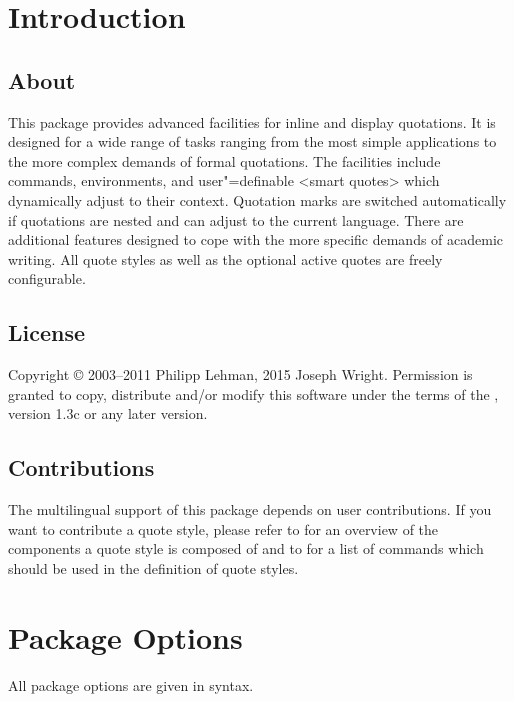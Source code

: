 \documentclass{ltxdockit}[2010/09/26]
\begin{document}
\printtitlepage
\tableofcontents
\listoftables

\section{Introduction}
\label{int}

\subsection[About]{About }

This package provides advanced facilities for inline and display quotations. It is designed for a wide range of tasks ranging from the most simple applications to the more complex demands of formal quotations. The facilities include commands, environments, and user"=definable <smart quotes> which dynamically adjust to their context. Quotation marks are switched automatically if quotations are nested and can adjust to the current language. There are additional features designed to cope with the more specific demands of academic writing. All quote styles as well as the optional active quotes are freely configurable.

\subsection{License}

Copyright © 2003--2011 Philipp Lehman, 2015 Joseph Wright. Permission is granted to copy, distribute and\slash or modify this software under the terms of the \lppl, version 1.3c or any later version. 

\subsection{Contributions}

The multilingual support of this package depends on user contributions. If you want to contribute a quote style, please refer to  for an overview of the components a quote style is composed of and to  for a list of commands which should be used in the definition of quote styles.

\section{Package Options}
\label{opt}

All package options are given in \keyval syntax.
\end{document}
